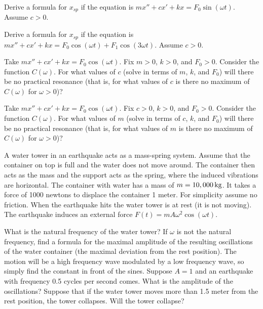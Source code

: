 \begin{exercise}
Derive a formula for $x_{sp}$ if the equation is
$m x'' + c x' + kx = F_0 \sin (\omega t)$.  Assume $c > 0$.
\end{exercise}

\begin{exercise}
Derive a formula for $x_{sp}$ if the equation is
$m x'' + c x' + kx = F_0 \cos (\omega t) + F_1 \cos (3\omega t)$.
Assume $c > 0$.
\end{exercise}

\begin{exercise}
Take $m x'' + c x' + kx = F_0 \cos (\omega t)$.
Fix $m > 0$, $k > 0$, and $F_0 > 0$.  Consider the function $C(\omega)$.
For what values of $c$ (solve in terms of $m$, $k$, and $F_0$) will there be no
practical resonance (that is, for what values of $c$ is there no maximum of
$C(\omega)$ for $\omega > 0$)?
\end{exercise}

\begin{exercise}
Take $m x'' + c x' + kx = F_0 \cos (\omega t)$.
Fix $c > 0$, $k > 0$, and $F_0 > 0$.  Consider the function $C(\omega)$.
For what values of $m$ (solve in terms of $c$, $k$, and $F_0$) will there be no
practical resonance (that is, for what values of $m$ is there no maximum of
$C(\omega)$ for $\omega > 0$)?
\end{exercise}

\begin{exercise}
A water tower in an earthquake acts as a mass-spring system.
Assume that the container on top is full and the water does not move around.
The container then acts as the mass and the support acts as the spring, where
the induced vibrations are horizontal.  The container with water
has a mass of $m=\unit[10,000]{kg}$.  It takes a force of 1000 newtons
to displace the container 1 meter.  For simplicity assume no friction.
When the earthquake hits the water tower is at rest (it is not moving).
%
The earthquake induces an external force 
$F(t) = m A \omega^2 \cos (\omega t)$.
\begin{tasks}
\task
What is the natural frequency of the water tower?
\task
If $\omega$ is not the natural frequency, find a formula for the maximal
amplitude of the resulting oscillations of the water container (the maximal
deviation from the rest position).  The motion will be a high frequency wave
modulated by a low frequency wave, so simply find the constant in front of the
sines.
\task
Suppose $A = 1$ and an earthquake with frequency 0.5 cycles per second
comes.  What is the amplitude of the oscillations?  Suppose that if the water
tower moves more than 1.5 meter from the rest position, the tower collapses.
Will the tower collapse?
\end{tasks}
\end{exercise}


